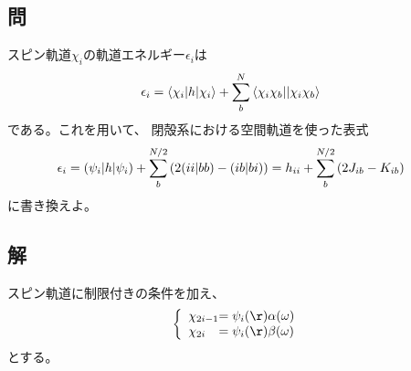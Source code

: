 \subsection{問}
スピン軌道$\chi_i$の軌道エネルギー$\epsilon_i$は
\begin{align}
	\epsilon_i
&=
	\braket{\chi_i|h|\chi_i}
	+
	\sum_b^N
		{\braket{\chi_i\chi_b||\chi_i\chi_b}}
\end{align}
である。これを用いて、
閉殻系における空間軌道を使った表式
\begin{align}
	\epsilon_i
&=
	{(\psi_i|h|\psi_i)}
	+
	\sum_b^{N/2}\left(
		2{(ii|bb)}
		-
		{(ib|bi)}
	\right)
=
	h_{ii}
	+
	\sum_b^{N/2}\left(
		2J_{ib}
		-
		K_{ib}
	\right)
\end{align}
に書き換えよ。

\subsection{解}
スピン軌道に制限付きの条件を加え、
\begin{align}
	\left\{
	\begin{array}{l@{}l}
			\chi_{2i-1}
		&=
			\psi_i(\r) \alpha(\omega) \\
			\chi_{2i}
		&=
			\psi_i(\r) \beta(\omega)
	\end{array}
	\right.
\end{align}
とする。

